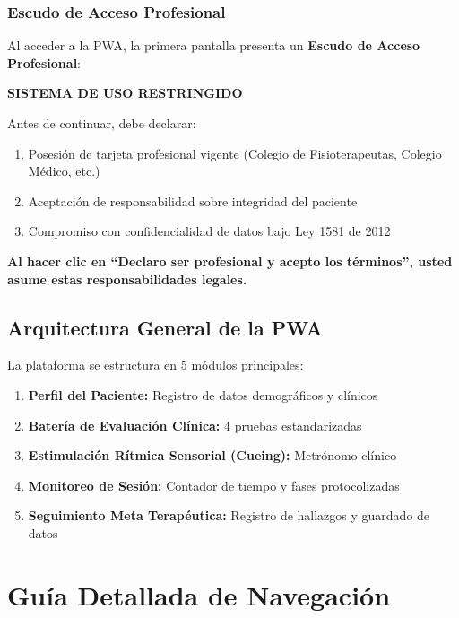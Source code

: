 \documentclass[12pt,a4paper,spanish,oneside]{book}
\begin{document}
\subsection{Escudo de Acceso Profesional}

Al acceder a la PWA, la primera pantalla presenta un \textbf{Escudo de Acceso Profesional}:

\begin{advertenciabox}
  \textbf{SISTEMA DE USO RESTRINGIDO}
  
  Antes de continuar, debe declarar:
  \begin{enumerate}
    \item Posesión de tarjeta profesional vigente (Colegio de Fisioterapeutas, Colegio Médico, etc.)
    \item Aceptación de responsabilidad sobre integridad del paciente
    \item Compromiso con confidencialidad de datos bajo Ley 1581 de 2012
  \end{enumerate}
  
  \textbf{Al hacer clic en ``Declaro ser profesional y acepto los términos'', usted asume estas responsabilidades legales.}
\end{advertenciabox}

\section{Arquitectura General de la PWA}

La plataforma se estructura en 5 módulos principales:

\begin{enumerate}
  \item \textbf{Perfil del Paciente:} Registro de datos demográficos y clínicos
  \item \textbf{Batería de Evaluación Clínica:} 4 pruebas estandarizadas
  \item \textbf{Estimulación Rítmica Sensorial (Cueing):} Metrónomo clínico
  \item \textbf{Monitoreo de Sesión:} Contador de tiempo y fases protocolizadas
  \item \textbf{Seguimiento Meta Terapéutica:} Registro de hallazgos y guardado de datos
\end{enumerate}

\chapter{Guía Detallada de Navegación}
\end{document}
